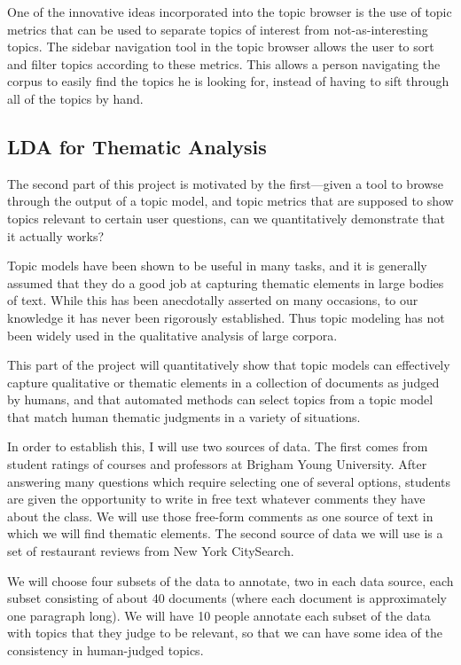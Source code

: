 \documentclass[ms]{byuprop}
\begin{document}
One of the innovative ideas incorporated into the topic browser is the use of
topic metrics that can be used to separate topics of interest from
not-as-interesting topics.  The sidebar navigation tool in the topic browser
allows the user to sort and filter topics according to these metrics.  This
allows a person navigating the corpus to easily find the topics he is looking
for, instead of having to sift through all of the topics by hand.

\subsection{LDA for Thematic Analysis}

The second part of this project is motivated by the first---given a tool to
browse through the output of a topic model, and topic metrics that are supposed
to show topics relevant to certain user questions, can we quantitatively
demonstrate that it actually works?

Topic models have been shown to be useful in many tasks, and it is generally
assumed that they do a good job at capturing thematic elements in large bodies
of text.  While this has been anecdotally asserted on many occasions, to our
knowledge it has never been rigorously established.  Thus topic modeling has
not been widely used in the qualitative analysis of large corpora.

This part of the project will quantitatively show that topic models can
effectively capture qualitative or thematic elements in a collection of
documents as judged by humans, and that automated methods can select topics
from a topic model that match human thematic judgments in a variety of
situations.

In order to establish this, I will use two sources of data.  The first comes
from student ratings of courses and professors at Brigham Young University.
After answering many questions which require selecting one of several options,
students are given the opportunity to write in free text whatever comments they
have about the class.  We will use those free-form comments as one source of
text in which we will find thematic elements.  The second source of data we
will use is a set of restaurant reviews from New York CitySearch.

We will choose four subsets of the data to annotate, two in each data source,
each subset consisting of about 40 documents (where each document is
approximately one paragraph long).  We will have 10 people annotate each subset
of the data with topics that they judge to be relevant, so that we can have
some idea of the consistency in human-judged topics.
\end{document}
